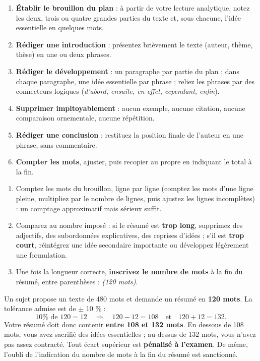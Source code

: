 \documentclass[11pt]{article}
\begin{document}
\begin{methode}
\begin{enumerate}
\item \textbf{Établir le brouillon du plan} : à partir de votre lecture analytique, notez les deux, trois ou quatre grandes parties du texte et, sous chacune, l'idée essentielle en quelques mots.
\item \textbf{Rédiger une introduction} : présentez brièvement le texte (auteur, thème, thèse) en une ou deux phrases.
\item \textbf{Rédiger le développement} : un paragraphe par partie du plan ; dans chaque paragraphe, une idée essentielle par phrase ; reliez les phrases par des connecteurs logiques (\emph{d'abord, ensuite, en effet, cependant, enfin}).
\item \textbf{Supprimer impitoyablement} : aucun exemple, aucune citation, aucune comparaison ornementale, aucune répétition.
\item \textbf{Rédiger une conclusion} : restituez la position finale de l'auteur en une phrase, sans commentaire.
\item \textbf{Compter les mots}, ajuster, puis recopier au propre en indiquant le total à la fin.
\end{enumerate}
\end{methode}

\begin{methode}
\begin{enumerate}
\item Comptez les mots du brouillon, ligne par ligne (comptez les mots d'une ligne pleine, multipliez par le nombre de lignes, puis ajustez les lignes incomplètes) : un comptage approximatif mais sérieux suffit.
\item Comparez au nombre imposé : si le résumé est \textbf{trop long}, supprimez des adjectifs, des subordonnées explicatives, des reprises d'idées ; s'il est \textbf{trop court}, réintégrez une idée secondaire importante ou développez légèrement une formulation.
\item Une fois la longueur correcte, \textbf{inscrivez le nombre de mots} à la fin du résumé, entre parenthèses : \emph{(120 mots)}.
\end{enumerate}
\end{methode}

\begin{exemplebox}
Un sujet propose un texte de 480 mots et demande un résumé en \textbf{120 mots}. La tolérance admise est de $\pm$ 10 \% :
\[ 10\% \text{ de } 120 = 12 \quad\Longrightarrow\quad 120 - 12 = 108 \quad\text{et}\quad 120 + 12 = 132. \]
Votre résumé doit donc contenir \textbf{entre 108 et 132 mots}. En dessous de 108 mots, vous avez sacrifié des idées essentielles ; au-dessus de 132 mots, vous n'avez pas assez contracté. Tout écart supérieur est \textbf{pénalisé à l'examen}. De même, l'oubli de l'indication du nombre de mots à la fin du résumé est sanctionné.
\end{exemplebox}
\end{document}
